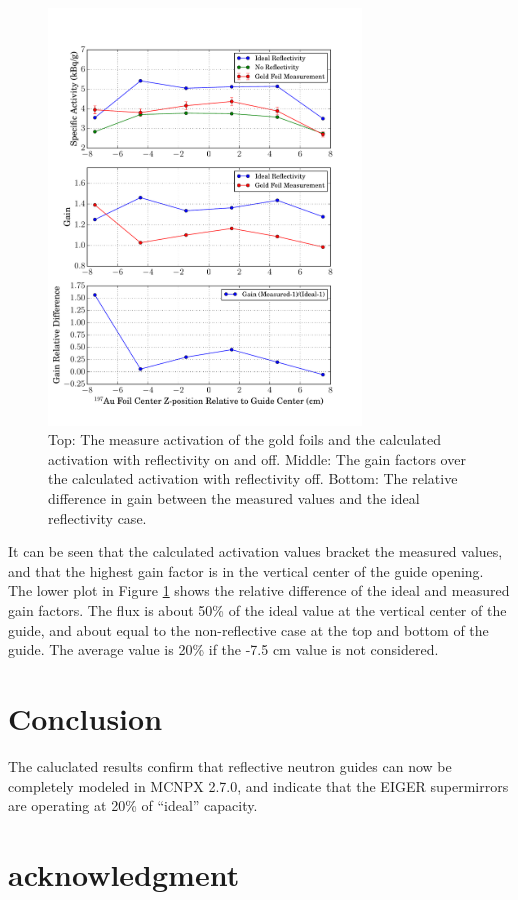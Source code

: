 \documentclass[a4paper,
              ]{jacow}
\begin{document}
\begin{figure}[!htb]
   \centering
   \includegraphics*[trim = 0mm 5mm 15mm 25mm, width=83mm]{graphics/GF_act.pdf}
   \caption{Top: The measure activation of the gold foils and the calculated activation with reflectivity on and off.  Middle:  The gain factors over the calculated activation with reflectivity off.  Bottom:  The relative difference in gain between the measured values and the ideal reflectivity case.}
   \label{activation}
\end{figure}

It can be seen that the calculated activation values bracket the measured values, and that the highest gain factor is in the vertical center of the guide opening.  The lower plot in Figure \ref{activation} shows the relative difference of the ideal and measured gain factors.  The flux is about 50\% of the ideal value at the vertical center of the guide, and about equal to the non-reflective case at the top and bottom of the guide.  The average value is 20\% if the -7.5 cm value is not considered.


\section{Conclusion}

The caluclated results confirm that reflective neutron guides can now be completely modeled in MCNPX 2.7.0, and indicate that the EIGER supermirrors are operating at 20\% of ``ideal'' capacity.  

\section{acknowledgment}
\end{document}
